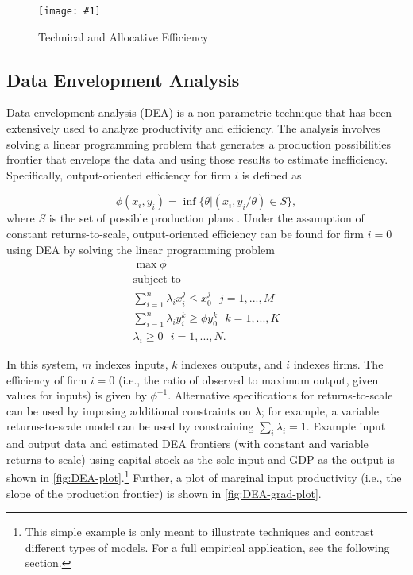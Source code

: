 \documentclass[twocolumn]{article}
\newcommand{\img}[1]{\texttt{[image: \#1]}}
\begin{document}
\begin{figure}
	\img{R/efficiencyExample.pdf}
	\caption{Technical and Allocative Efficiency}
	\label{fig:efficiencyExample}
\end{figure}

\subsection{Data Envelopment Analysis}

Data envelopment analysis (DEA) is a non-parametric technique that has been extensively used to analyze productivity and efficiency. The analysis involves solving a linear programming problem that generates a production possibilities frontier that envelops the data and using those results to estimate inefficiency. Specifically, output-oriented efficiency for firm $i$ is defined as

\begin{equation}
\phi(x_i, y_i) = \inf\{\theta|(x_i, y_i / \theta)\in S\},
\end{equation}
where $S$ is the set of possible production plans \citep{Shepherd}. Under the assumption of constant returns-to-scale, output-oriented efficiency can be found for firm $i=0$ using DEA by solving the linear programming problem
\begin{align}
\nonumber
\max \phi\\
\nonumber
\mbox{subject to}\\
\nonumber
\sum_{i=1}^n \lambda_i x_i^j \leq x_0^j \mbox{\ \ \ \ }j=1,...,M\\
\nonumber
\sum_{i=1}^n \lambda_i y_i^k \geq \phi y_0^k \mbox{\ \ \ \ }k=1,...,K\\
\nonumber
\lambda_i \geq 0 \mbox{\ \ \ \ }i=1,...,N.
\end{align}

\noindent
In this system, $m$ indexes inputs, $k$ indexes outputs, and $i$ indexes firms. The efficiency of firm $i=0$ (i.e., the ratio of observed to maximum output, given values for inputs) is given by $\phi^{-1}$. Alternative specifications for returns-to-scale can be used by imposing additional constraints on $\lambda$; for example, a variable returns-to-scale model can be used by constraining $\sum_i \lambda_i = 1$. Example input and output data and estimated DEA frontiers (with constant and variable returns-to-scale) using capital stock as the sole input and GDP as the output is shown in \cref{fig:DEA-plot}.\footnote{This simple example is only meant to illustrate techniques and contrast different types of models. For a full empirical application, see the following section.} Further, a plot of marginal input productivity (i.e., the slope of the production frontier) is shown in \cref{fig:DEA-grad-plot}.
\end{document}
